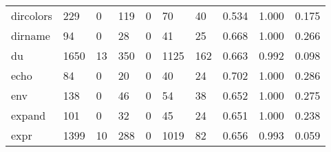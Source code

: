 \begin{longtable}{lp{1.3cm}p{1.3cm}p{1.3cm}p{1.3cm}p{1.3cm}p{1.3cm}p{1.3cm}p{1.3cm}p{1.3cm}}
dircolors &                    229 &                                  0 &                               119 &                                0 &                                70 &                              40 &                                0.534 &                                  1.000 &                                0.175 \\
dirname   &                     94 &                                  0 &                                28 &                                0 &                                41 &                              25 &                                0.668 &                                  1.000 &                                0.266 \\
du        &                   1650 &                                 13 &                               350 &                                0 &                              1125 &                             162 &                                0.663 &                                  0.992 &                                0.098 \\
echo      &                     84 &                                  0 &                                20 &                                0 &                                40 &                              24 &                                0.702 &                                  1.000 &                                0.286 \\
env       &                    138 &                                  0 &                                46 &                                0 &                                54 &                              38 &                                0.652 &                                  1.000 &                                0.275 \\
expand    &                    101 &                                  0 &                                32 &                                0 &                                45 &                              24 &                                0.651 &                                  1.000 &                                0.238 \\
expr      &                   1399 &                                 10 &                               288 &                                0 &                              1019 &                              82 &                                0.656 &                                  0.993 &                                0.059 \\

\end{longtable}
